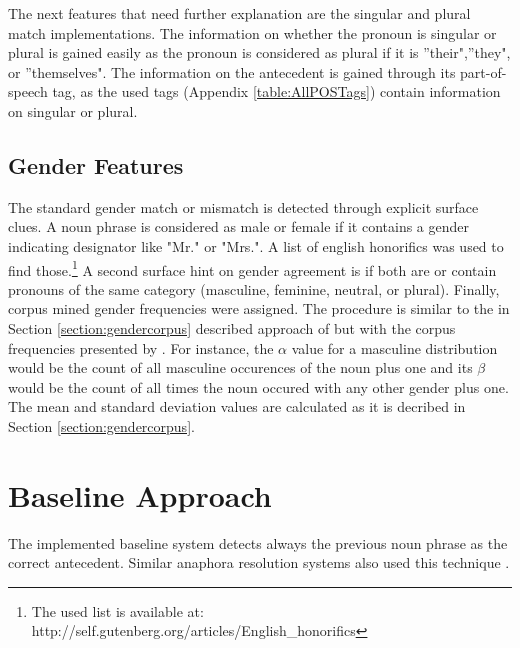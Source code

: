 The next features that need further explanation are the singular and plural match implementations. The information on whether the pronoun is singular or plural is gained easily as the pronoun is considered as plural if it is ''their",''they", or ''themselves". The information on the antecedent is gained through its part-of-speech tag, as the used tags (Appendix \ref{table:AllPOSTags}) contain information on singular or plural.

\subsection{Gender Features}
The standard gender match or mismatch is detected through explicit surface clues. A noun phrase is considered as male or female if it contains a gender indicating designator like "Mr." or "Mrs.". A list of english honorifics was used to find those.\footnote{The used list is available at: http://self.gutenberg.org/articles/English\_honorifics} A second surface hint on gender agreement is if both are or contain pronouns of the same category (masculine, feminine, neutral, or plural).
Finally, corpus mined gender frequencies were assigned. The procedure is similar to the in Section \ref{section:gendercorpus} described approach of \cite{bergsma2005automatic} but with the corpus frequencies presented by \cite{Bergsma:06}. For instance, the $\alpha$ value for a masculine distribution would be the count of all masculine occurences of the noun plus one and its $\beta$ would be the count of all times the noun occured with any other gender plus one. The mean and standard deviation values are calculated as it is decribed in Section \ref{section:gendercorpus}.

\section{Baseline Approach}
The implemented baseline system detects always the previous noun phrase as the correct antecedent. Similar anaphora resolution systems also used this technique \citep{poesio2004general,bergsma2005automatic}.

